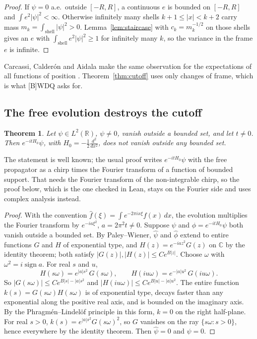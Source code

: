\documentclass[11pt]{article}
\newtheorem{theorem}{Theorem}[section]
\theoremstyle{remark}
\begin{document}
\begin{proof}
  If $\psi = 0$ a.e.\ outside $[-R,R]$, a continuous $e$ is bounded on $[-R,R]$ and
  $\int e^2|\psi|^2 < \infty$. Otherwise infinitely many shells $k+1 \le |x| < k+2$ carry mass
  $m_k = \int_{\text{shell}}|\psi|^2 > 0$. Lemma~\ref{lem:staircase} with $c_k = m_k^{-1/2}$ on
  those shells gives an $e$ with $\int_{\text{shell}} e^2|\psi|^2 \ge 1$ for infinitely many $k$,
  so the variance in the frame $e$ is infinite.
\end{proof}

Carcassi, Calderón and Aidala make the same observation for the expectations of all functions of
position \cite[Appendix, Sec.~VIII]{cca}. Theorem~\ref{thm:cutoff} uses only changes of frame,
which is what [B]WDQ asks for.

\subsection{The free evolution destroys the cutoff}

\begin{theorem}\label{thm:evolution}
  Let $\psi \in L^2(\mathbb R)$, $\psi \ne 0$, vanish outside a bounded set, and let $t \ne 0$.
  Then $e^{-itH_0}\psi$, with $H_0 = -\frac12\frac{d^2}{dx^2}$, does not vanish outside any
  bounded set.
\end{theorem}

The statement is well known; the usual proof writes $e^{-itH_0}\psi$ with the free propagator as
a chirp times the Fourier transform of a function of bounded support. That needs the Fourier
transform of the non-integrable chirp, so the proof below, which is the one checked in Lean,
stays on the Fourier side and uses complex analysis instead.

\begin{proof}
  With the convention $\hat f(\xi) = \int e^{-2\pi i x\xi} f(x)\,dx$, the evolution multiplies
  the Fourier transform by $e^{-ia\xi^2}$, $a = 2\pi^2 t \ne 0$. Suppose $\psi$ and
  $\phi = e^{-itH_0}\psi$ both vanish outside a bounded set. By Paley--Wiener, $\hat\psi$ and
  $\hat\phi$ extend to entire functions $G$ and $H$ of exponential type, and
  $H(z) = e^{-iaz^2}G(z)$ on $\mathbb C$ by the identity theorem; both satisfy
  $|G(z)|, |H(z)| \le Ce^{B|z|}$. Choose $\omega$ with $\omega^2 = i\operatorname{sign}a$. For
  real $s$ and $u$,
  \[
    H(s\omega) = e^{|a|s^2}\,G(s\omega), \qquad H(iu\omega) = e^{-|a|u^2}\,G(iu\omega).
  \]
  So $|G(s\omega)| \le Ce^{B|s| - |a|s^2}$ and $|H(iu\omega)| \le Ce^{B|u| - |a|u^2}$. The entire
  function $k(s) = G(s\omega)H(s\omega)$ is of exponential type, decays faster than any
  exponential along the positive real axis, and is bounded on the imaginary axis. By the
  Phragmén--Lindelöf principle in this form, $k = 0$ on the right half-plane. For real $s > 0$,
  $k(s) = e^{|a|s^2}G(s\omega)^2$, so $G$ vanishes on the ray $\{s\omega : s > 0\}$, hence
  everywhere by the identity theorem. Then $\hat\psi = 0$ and $\psi = 0$.
\end{proof}
\end{document}
